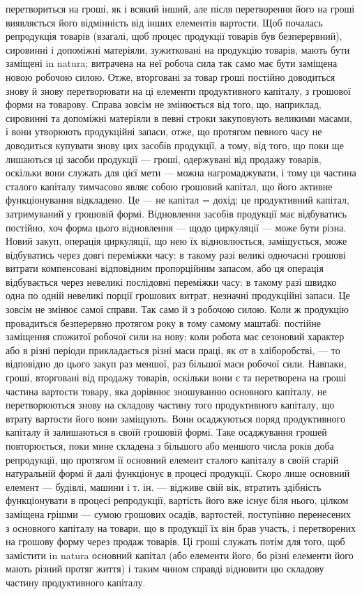 \parcont{}  %
перетвориться на гроші, як і всякий інший, але після перетворення його
на гроші виявляється його відмінність від інших елементів вартости.
Щоб почалась репродукція товарів (взагалі, щоб процес продукції
товарів був безперервний), сировинні і допоміжні матеріяли, зужитковані на
продукцію товарів, мають бути заміщені in natura; витрачена на неї робоча
сила так само має бути заміщена новою робочою силою. Отже, вторговані
за товар гроші постійно доводиться знову й знову перетворювати на ці елементи
продуктивного капіталу, з грошової форми на товарову. Справа зовсім
не змінюється від того, що, наприклад, сировинні та допоміжні матеріяли
в певні строки закуповують великими масами, і вони утворюють
продукційні запаси, отже, що протягом певного часу не доводиться купувати
знову цих засобів продукції, а тому, від того, що поки ще
лишаються ці засоби продукції — гроші, одержувані від продажу товарів,
оскільки вони служать для цієї мети — можна нагромаджувати, і тому
ця частина сталого капіталу тимчасово являє собою грошовий капітал,
що його активне функціонування відкладено. Це — не капітал = дохід; це
продуктивний капітал, затримуваний у грошовій формі. Відновлення засобів
продукції має відбуватись постійно, хоч форма цього відновлення
— щодо циркуляції — може бути різна. Новий закуп, операція циркуляції,
що нею їх відновлюється, заміщується, може відбуватись через довгі переміжки
часу: в такому разі великі одночасні грошові витрати компенсовані
відповідним пропорційним запасом, або ця операція відбувається через невеликі
послідовні переміжки часу: в такому разі швидко одна по одній невеликі
порції грошових витрат, незначні продукційні запаси. Це зовсім не
змінює самої справи. Так само й з робочою силою. Коли ж продукцію
провадиться безперервно протягом року в тому самому маштабі: постійне
заміщення спожитої робочої сили на нову; коли робота має сезоновий характер
або в різні періоди прикладається різні маси праці, як от в хліборобстві,
— то відповідно до цього закуп раз меншої, раз більшої маси робочої
сили. Навпаки, гроші, вторговані від продажу товарів, оскільки вони
є та перетворена на гроші частина вартости товару, яка дорівнює зношуванню
основного капіталу, не перетворюються знову на складову частину
того продуктивного капіталу, що втрату вартости його вони заміщують.
Вони осаджуються поряд продуктивного капіталу й залишаються в своїй
грошовій формі. Таке осаджування грошей повторюється, поки мине
складена з більшого або меншого числа років доба репродукції, що
протягом її основний елемент сталого капіталу в своїй старій натуральній
формі й далі функціонує в процесі продукції. Скоро лише основний
елемент — будівлі, машини і т. ін. — відживе свій вік, втратить здібність
функціонувати в процесі репродукції, вартість його вже існує біля нього,
цілком заміщена грішми — сумою грошових осадів, вартостей, поступінно
перенесених з основного капіталу на товари, що в продукції їх він брав
участь, і перетворених на грошову форму через продаж товарів. Ці гроші
служать потім для того, щоб замістити in natura основний капітал (або
елементи його, бо різні елементи його мають різний протяг життя) і таким
чином справді відновити цю складову частину продуктивного капіталу.
\parbreak{}  %
